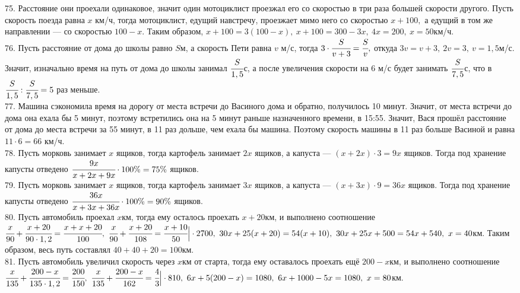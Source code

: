 \documentclass[12pt]{article}
\begin{document}
75. Расстояние они проехали одинаковое, значит один мотоциклист проезжал его со скоростью в три раза большей скорости другого. Пусть скорость поезда равна $x$ км/ч, тогда мотоциклист, едущий навстречу, проезжает мимо него со скоростью $x+100,$ а едущий в том же направлении --- со скоростью $100-x.$ Таким образом, $x+100=3(100-x),\ x+100=300-3x,\ 4x=200,\ x=50$км/ч.\\
76. Пусть расстояние от дома до школы равно $S$м, а скорость Пети равна $v$ м/с, тогда $3\cdot\cfrac{S}{v+3}=\cfrac{S}{v},$ откуда $3v=v+3,\ 2v=3,\ v=1,5$м/с. Значит, изначально время на путь от дома до школы занимал $\cfrac{S}{1,5}$с, а после увеличения скорости на 6 м/с будет занимать $\cfrac{S}{7,5}$с, что в $\cfrac{S}{1,5}:\cfrac{S}{7,5}=5$ раз меньше.\\
77. Машина сэкономила время на дорогу от места встречи до Васиного дома и обратно, получилось 10 минут. Значит, от места встречи до дома она ехала бы 5 минут, поэтому встретились она на 5 минут раньше назначенного времени, в 15:55. Значит, Вася прошёл расстояние от дома до места встречи за 55 минут, в 11 раз дольше, чем ехала бы машина. Поэтому скорость машины в 11 раз больше Васиной и равна $11\cdot6=66$ км/ч.\\
78. Пусть морковь занимает $x$ ящиков, тогда картофель занимает $2x$ ящиков, а капуста --- $(x+2x)\cdot3=9x$ ящиков. Тогда под хранение капусты отведено $\cfrac{9x}{x+2x+9x}\cdot100\%=75\%$ ящиков.\\
79. Пусть морковь занимает $x$ ящиков, тогда картофель занимает $3x$ ящиков, а капуста --- $(x+3x)\cdot9=36x$ ящиков. Тогда под хранение капусты отведено $\cfrac{36x}{x+3x+36x}\cdot100\%=90\%$ ящиков.\\
80. Пусть автомобиль проехал $x$км, тогда ему осталось проехать $x+20$км, и выполнено соотношение $\cfrac{x}{90}+\cfrac{x+20}{90\cdot1,2}=\cfrac{x+x+20}{100},\
\cfrac{x}{90}+\cfrac{x+20}{108}=\cfrac{x+10}{50}\Big|\cdot2700,\
30x+25(x+20)=54(x+10),\ 30x+25x+500=54x+540,\ x=40$км. Таким образом, весь путь составлял $40+40+20=100$км.\\
81. Пусть автомобиль увеличил скорость через $x$км от старта, тогда ему оставалось проехать ещё $200-x$км, и выполнено соотношение
$\cfrac{x}{135}+\cfrac{200-x}{135\cdot1,2}=\cfrac{200}{150},\
\cfrac{x}{135}+\cfrac{200-x}{162}=\cfrac{4}{3}\Big|\cdot 810,\
6x+5(200-x)=1080,\ 6x+1000-5x=1080,\ x=80$км.
\newpage
\end{document}
